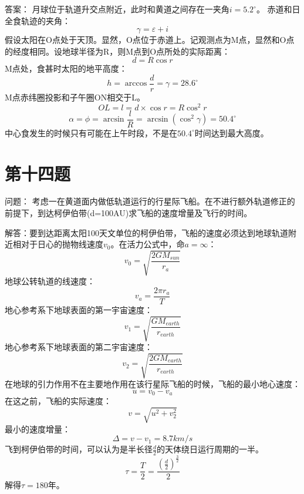 \documentclass[a4paper,12pt]{report}
\begin{document}
\noindent 答案：
月球位于轨道升交点附近，此时和黄道之间存在一夹角$i=5.2^\circ $。
赤道和日全食轨迹的夹角：
\begin{equation}
	\gamma =\varepsilon +i
\end{equation}
假设太阳在O点处于天顶。显然，O点位于赤道上。记观测点为M点，显然和O点的经度相同。设地球半径为R，则M点到O点所处的实际距离：
\begin{equation}
	d=R \cos r
\end{equation}
M点处，食甚时太阳的地平高度：
\begin{equation}
	h=\arccos \frac{d}{r}=\gamma =28.6^\circ
\end{equation}
M点赤纬圈投影和子午圈ON相交于L。
\begin{equation}
	OL=l=d\times \cos r=R\cos ^2 r
\end{equation}
\begin{equation}
	\alpha =\phi =\arcsin \frac{l}{R}=\arcsin(\cos^2 \gamma)=50.4^\circ
\end{equation}
中心食发生的时候只有可能在上午时段，不是在$50.4^\circ$时间达到最大高度。

\section{第十四题}
\noindent 问题：
考虑一在黄道面内做低轨道运行的行星际飞船。在不进行额外轨道修正的前提下，到达柯伊伯带(d=100AU)求飞船的速度增量及飞行的时间。

\noindent 解答：要到达距离太阳100天文单位的柯伊伯带，飞船的速度必须达到地球轨道附近相对于日心的抛物线速度$v_{0}$。在活力公式中，命$a=\infty $：
\begin{equation}
	v_{0}=\sqrt{\frac{2GM_{sun}}{r_{a}}}
\end{equation}
地球公转轨道的线速度：
\begin{equation}
	v_{a}=\frac{2\pi r_{a}}{T}
\end{equation}
地心参考系下地球表面的第一宇宙速度：
\begin{equation}
	v_{1}=\sqrt{\frac{GM_{earth}}{r_{earth}}}
\end{equation}
地心参考系下地球表面的第二宇宙速度：
\begin{equation}
	v_{2}=\sqrt{\frac{2GM_{earth}}{r_{earth}}}
\end{equation}
在地球的引力作用不在主要地作用在该行星际飞船的时候，飞船的最小地心速度：
\begin{equation}
	u=v_{0}-v_{a}
\end{equation}
在这之前，飞船的实际速度：
\begin{equation}
	v=\sqrt{u^2+v_{2}^{2}}
\end{equation}
最小的速度增量：
\begin{equation}
	\Delta =v-v_{1}=8.7km/s
\end{equation}
飞到柯伊伯带的时间，可以认为是半长径$\frac{d}{2}$的天体绕日运行周期的一半。
\begin{equation}
	\tau =\frac{T}{2}=\frac{(\frac{d}{2})^\frac{3}{2}}{2}
\end{equation}
解得$\tau =180$年。
\end{document}
